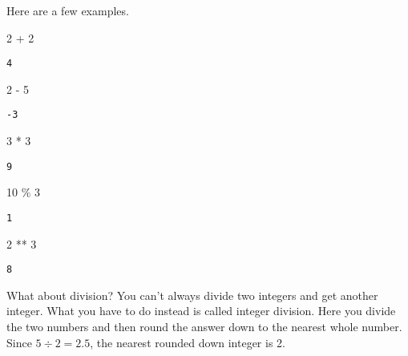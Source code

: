 \documentclass[
  letterpaper,
  DIV=11,
  numbers=noendperiod]{scrreprt}
\newenvironment{Shaded}{\begin{snugshade}}{\end{snugshade}}
\newcommand{\DecValTok}[1]{\textcolor[rgb]{0.68,0.00,0.00}{#1}}
\newcommand{\OperatorTok}[1]{\textcolor[rgb]{0.37,0.37,0.37}{#1}}
\begin{document}
Here are a few examples.

\begin{Shaded}
\begin{Highlighting}[]
\DecValTok{2} \OperatorTok{+} \DecValTok{2}
\end{Highlighting}
\end{Shaded}

\begin{verbatim}
4
\end{verbatim}

\begin{Shaded}
\begin{Highlighting}[]
\DecValTok{2} \OperatorTok{{-}} \DecValTok{5}
\end{Highlighting}
\end{Shaded}

\begin{verbatim}
-3
\end{verbatim}

\begin{Shaded}
\begin{Highlighting}[]
\DecValTok{3} \OperatorTok{*} \DecValTok{3}
\end{Highlighting}
\end{Shaded}

\begin{verbatim}
9
\end{verbatim}

\begin{Shaded}
\begin{Highlighting}[]
\DecValTok{10} \OperatorTok{\%} \DecValTok{3}
\end{Highlighting}
\end{Shaded}

\begin{verbatim}
1
\end{verbatim}

\begin{Shaded}
\begin{Highlighting}[]
\DecValTok{2} \OperatorTok{**} \DecValTok{3}
\end{Highlighting}
\end{Shaded}

\begin{verbatim}
8
\end{verbatim}

What about division? You can't always divide two integers and get
another integer. What you have to do instead is called integer division.
Here you divide the two numbers and then round the answer down to the
nearest whole number. Since \(5 \div 2 = 2.5\), the nearest rounded down
integer is 2.
\end{document}

